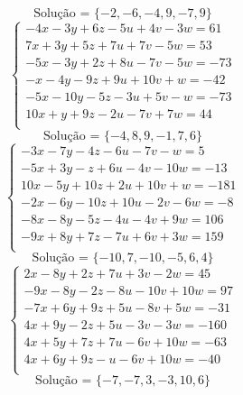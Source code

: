 \documentclass[12pt,oneside,a4paper]{article}
\begin{document}
\begin{equation*}
\text{Solução = }\{-2,-6,-4,9,-7,9\}
\end{equation*}
\vspace{\baselineskip}
\begin{equation*}
\begin{cases}
-4x-3y+6z-5u+4v-3w=61 \\
7x+3y+5z+7u+7v-5w=53 \\
-5x-3y+2z+8u-7v-5w=-73 \\
-x-4y-9z+9u+10v+w=-42 \\
-5x-10y-5z-3u+5v-w=-73 \\
10x+y+9z-2u-7v+7w=44 \\
\end{cases}
\end{equation*}
\begin{equation*}
\text{Solução = }\{-4,8,9,-1,7,6\}
\end{equation*}
\vspace{\baselineskip}
\begin{equation*}
\begin{cases}
-3x-7y-4z-6u-7v-w=5 \\
-5x+3y-z+6u-4v-10w=-13 \\
10x-5y+10z+2u+10v+w=-181 \\
-2x-6y-10z+10u-2v-6w=-8 \\
-8x-8y-5z-4u-4v+9w=106 \\
-9x+8y+7z-7u+6v+3w=159 \\
\end{cases}
\end{equation*}
\begin{equation*}
\text{Solução = }\{-10,7,-10,-5,6,4\}
\end{equation*}
\vspace{\baselineskip}
\begin{equation*}
\begin{cases}
2x-8y+2z+7u+3v-2w=45 \\
-9x-8y-2z-8u-10v+10w=97 \\
-7x+6y+9z+5u-8v+5w=-31 \\
4x+9y-2z+5u-3v-3w=-160 \\
4x+5y+7z+7u-6v+10w=-63 \\
4x+6y+9z-u-6v+10w=-40 \\
\end{cases}
\end{equation*}
\begin{equation*}
\text{Solução = }\{-7,-7,3,-3,10,6\}
\end{equation*}
\end{document}
